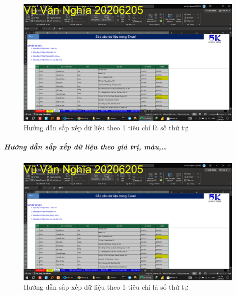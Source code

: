 \documentclass{article}
\begin{document}
\begin{center}
    \begin{figure}[h]
        \centering
        \includegraphics[scale = 0.15]{Video1/HuongDan/1.png}
        \caption{Hướng dẫn sắp xếp dữ liệu theo 1 tiêu chí là số thứ tự}
    \end{figure}
\end{center}


\subparagraph{Hướng dẫn sắp xếp dữ liệu theo giá trị, màu,\dots}

\begin{center}
    \begin{figure}[h]
        \centering
        \includegraphics[scale = 0.15]{Video1/HuongDan/1.png}
        \caption{Hướng dẫn sắp xếp dữ liệu theo 1 tiêu chí là số thứ tự}
    \end{figure}
\end{center}
\end{document}

